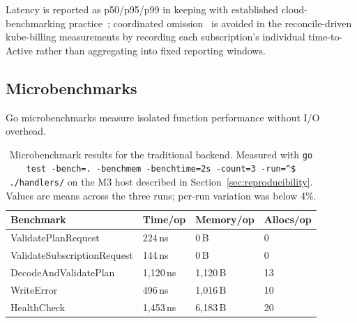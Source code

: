 Latency is reported as p50/p95/p99 in keeping with established cloud-benchmarking practice~\cite{tene_latency, hdrhistogram, gregg2020systems}; coordinated omission~\cite{tene_latency} is avoided in the reconcile-driven kube-billing measurements by recording each subscription's individual time-to-Active rather than aggregating into fixed reporting windows.

\subsection{Microbenchmarks}

Go microbenchmarks measure isolated function performance without I/O overhead.

\begin{table}[h]
\centering
\small
\caption{Microbenchmark results for the traditional backend. Measured with \texttt{go test -bench=. -benchmem -benchtime=2s -count=3 -run=\^{}\$ ./handlers/} on the M3 host described in Section~\ref{sec:reproducibility}. Values are means across the three runs; per-run variation was below 4\%.}
\label{tab:microbenchmarks}
\begin{tabularx}{\textwidth}{@{}lXXX@{}}
\toprule
\textbf{Benchmark} & \textbf{Time/op} & \textbf{Memory/op} & \textbf{Allocs/op} \\ \midrule
ValidatePlanRequest         & 224\,ns   & 0\,B       & 0  \\
ValidateSubscriptionRequest & 144\,ns   & 0\,B       & 0  \\
DecodeAndValidatePlan       & 1{,}120\,ns & 1{,}120\,B & 13 \\
WriteError                  & 496\,ns   & 1{,}016\,B & 10 \\
HealthCheck                 & 1{,}453\,ns & 6{,}183\,B & 20 \\ \bottomrule
\end{tabularx}
\end{table}

